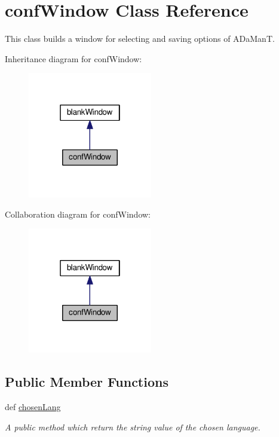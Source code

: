 \hypertarget{classgui_1_1window3a_1_1confWindow}{\section{conf\-Window Class Reference}
\label{classgui_1_1window3a_1_1confWindow}
}


This class builds a window for selecting and saving options of A\-Da\-Man\-T.  




Inheritance diagram for conf\-Window\-:\nopagebreak
\begin{figure}[H]
\begin{center}
\leavevmode
\includegraphics[width=154pt]{classgui_1_1window3a_1_1confWindow__inherit__graph}
\end{center}
\end{figure}


Collaboration diagram for conf\-Window\-:\nopagebreak
\begin{figure}[H]
\begin{center}
\leavevmode
\includegraphics[width=154pt]{classgui_1_1window3a_1_1confWindow__coll__graph}
\end{center}
\end{figure}
\subsection*{Public Member Functions}
\begin{DoxyCompactItemize}
\item 
\hypertarget{classgui_1_1window3a_1_1confWindow_a2d2bfbe7abc45a786220f7555e52b01c}{def \hyperlink{classgui_1_1window3a_1_1confWindow_a2d2bfbe7abc45a786220f7555e52b01c}{chosen\-Lang}}\label{classgui_1_1window3a_1_1confWindow_a2d2bfbe7abc45a786220f7555e52b01c}

\begin{DoxyCompactList}\small\item\em A public method which return the string value of the chosen language. \end{DoxyCompactList}\end{DoxyCompactItemize}


